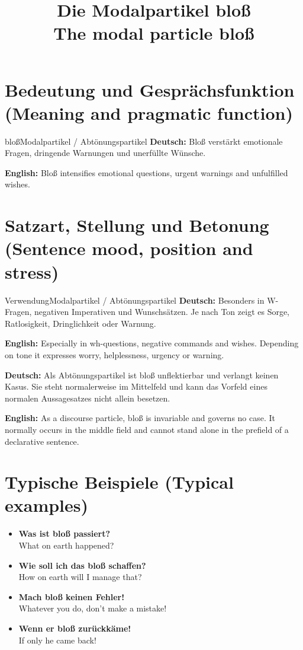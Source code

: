 \documentclass[a4paper,11pt]{article}
\title{Die Modalpartikel \glqq bloß\grqq\\{\large\textnormal{The modal particle bloß}}}
\date{}
\newcommand{\GermanText}[1]{\textbf{Deutsch: }#1\par}
\newcommand{\EnglishText}[1]{{\small\color{SoftGray}\textbf{English: }#1\par}}
\newcommand{\ExampleItem}[2]{\item \textbf{#1}\\{\small\color{SoftGray}#2}}
\begin{document}
\maketitle
\tableofcontents
\section{Bedeutung und Gesprächsfunktion \textnormal{(Meaning and pragmatic function)}}
\begin{grammarentry}{bloß}{Modalpartikel / Abtönungspartikel}
\GermanText{Bloß verstärkt emotionale Fragen, dringende Warnungen und unerfüllte Wünsche.}
\EnglishText{Bloß intensifies emotional questions, urgent warnings and unfulfilled wishes.}
\end{grammarentry}
\section{Satzart, Stellung und Betonung \textnormal{(Sentence mood, position and stress)}}
\begin{grammarentry}{Verwendung}{Modalpartikel / Abtönungspartikel}
\GermanText{Besonders in W-Fragen, negativen Imperativen und Wunschsätzen. Je nach Ton zeigt es Sorge, Ratlosigkeit, Dringlichkeit oder Warnung.}
\EnglishText{Especially in wh-questions, negative commands and wishes. Depending on tone it expresses worry, helplessness, urgency or warning.}
\end{grammarentry}
\GermanText{Als Abtönungspartikel ist bloß unflektierbar und verlangt keinen Kasus. Sie steht normalerweise im Mittelfeld und kann das Vorfeld eines normalen Aussagesatzes nicht allein besetzen.}
\EnglishText{As a discourse particle, bloß is invariable and governs no case. It normally occurs in the middle field and cannot stand alone in the prefield of a declarative sentence.}
\section{Typische Beispiele \textnormal{(Typical examples)}}
\begin{exbox}\begin{itemize}
\ExampleItem{Was ist bloß passiert?}{What on earth happened?}
\ExampleItem{Wie soll ich das bloß schaffen?}{How on earth will I manage that?}
\ExampleItem{Mach bloß keinen Fehler!}{Whatever you do, don't make a mistake!}
\ExampleItem{Wenn er bloß zurückkäme!}{If only he came back!}
\end{itemize}\end{exbox}
\end{document}
